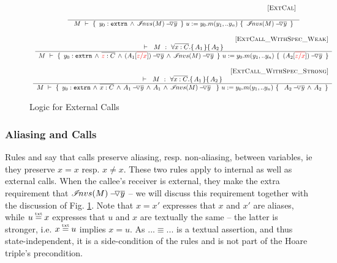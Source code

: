 {%
\begin{figure}[hbt]
$\begin{array}{c}
\inferruleSD{\hspace{4.7cm} [\sc{ExtCal}]}
	{ 
   	 
        }
	{   \hproves{M} 
						{ \    { \external{y_0} }\,     \wedge \,  \PushAS {y}{\extract{M}}\   }
						{ \ u:=y_0.m(y_1,.. y_n)\    }
						{ \    \PushAS {y}{\extract{M}}   \ }	
}
\\
\\
\inferruleSD{\hspace{4.7cm} [\sc{ExtCall\_WithSpec\_Weak}]}
	{ 
   	\promises M   {\TwoStatesQ {\overline {x:C}} {A_1}{A_2}}
        }
	{   \hproves{M} 
						{ \    { \external{y_0} }\, \wedge \, \overline {\red{z}:C}  \, \wedge \,  \PushAS  {y}{  (A_1[\red{\overline{z/x}}])} \,   \wedge \,  \PushAS {y}{\extract{M}}\  }
						{ \ u:=y_0.m(y_1,.. y_n)\   }
						{ \ \PushAS  {y}  { (A_2[\red{\overline{z/x}}])}    \ }	
}
\\
\\
\inferruleSD{\hspace{4.7cm}[\sc{ExtCall\_WithSpec\_Strong}]}
	{        	
	\promises M   {\TwoStatesQ {\overline {x:C}} {A_1}{A_2}}
   	}
	{   \hproves{M} 
						{ \  {\external{y_0}  } \, \wedge\, \overline {x:C}\, \wedge\,  \PushAS  {y} { A_1} \, \wedge\,  A_1\, \wedge\,  \PushAS {y}{\extract{M}}\   \  }
						{ \ u:=y_0.m(y_1,.. y_n)\    }
						{ \  \ \PushAS  {y} { A_2}\,  \wedge\, A_2 \  }	
}\
\\
\end{array}
$
\caption{Logic for External Calls}
\label{f:external:calls}
\end{figure}

\subsubsection{Aliasing and Calls}

{Rules  {}  and  {} say that calls preserve aliasing, resp. non-aliasing, between variables, ie they preserve $x=x$ resp. $x\neq x$. These two rules apply to internal as well as external calls. When the callee's receiver is external, they make the extra requirement that  $\PushAS {y}{\extract{M}}$ -- we  will discuss this requirement together with the discussion of Fig. \ref{f:external:calls}.     Note that $x=x'$ expresses that $x$ and $x'$ are aliases, while  $u\txteq x$ expresses that $u$ and $x$ are textually the same --
the latter is stronger, i.e.   $x\txteq u$ implies $x=u$. 
 As $...\equiv ...$ is a textual assertion, and thus  state-independent,  it is a side-condition of the rules and is  not part of the Hoare triple's precondition.
}


}
